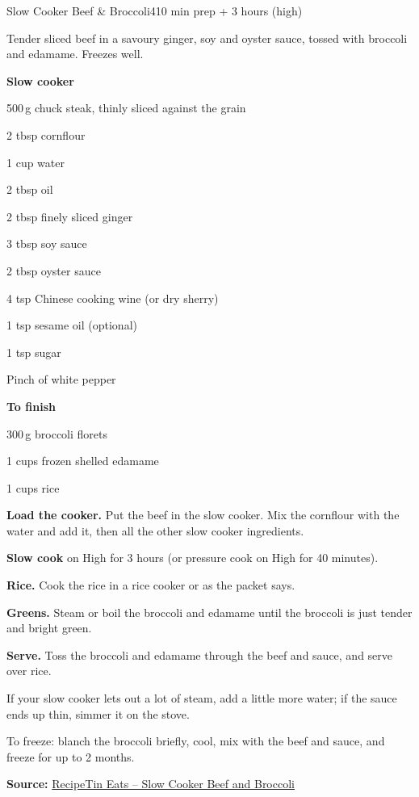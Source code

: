 \begin{recipebox}{Slow Cooker Beef \& Broccoli}{4}{10 min prep + 3 hours (high)}

Tender sliced beef in a savoury ginger, soy and oyster sauce, tossed with
broccoli and edamame. Freezes well.

\begin{ingredients}
  \item[] \textbf{Slow cooker}
  \item 500\,g chuck steak, thinly sliced against the grain
  \item 2 tbsp cornflour
  \item 1 cup water
  \item 2 tbsp oil
  \item 2 tbsp finely sliced ginger
  \item 3 tbsp soy sauce
  \item 2 tbsp oyster sauce
  \item 4 tsp Chinese cooking wine (or dry sherry)
  \item 1 tsp sesame oil (optional)
  \item 1 tsp sugar
  \item Pinch of white pepper
  \item[] \textbf{To finish}
  \item 300\,g broccoli florets
  \item 1 cups frozen shelled edamame
  \item 1 cups rice
\end{ingredients}

\begin{method}
  \item \textbf{Load the cooker.} Put the beef in the slow cooker. Mix the cornflour
        with the water and add it, then all the other slow cooker ingredients.
  \item \textbf{Slow cook} on High for 3 hours (or pressure cook on High for 40
        minutes).
  \item \textbf{Rice.} Cook the rice in a rice cooker or as the packet says.
  \item \textbf{Greens.} Steam or boil the broccoli and edamame until the broccoli is
        just tender and bright green.
  \item \textbf{Serve.} Toss the broccoli and edamame through the beef and sauce, and
        serve over rice.
\end{method}

\begin{notelist}
  \item If your slow cooker lets out a lot of steam, add a little more water; if the
        sauce ends up thin, simmer it on the stove.
  \item To freeze: blanch the broccoli briefly, cool, mix with the beef and sauce, and
        freeze for up to 2 months.
\end{notelist}

\noindent\textbf{Source:} \href{https://www.recipetineats.com/slow-cooker-beef-broccoli/}{RecipeTin Eats -- Slow Cooker Beef and Broccoli}

\end{recipebox}
